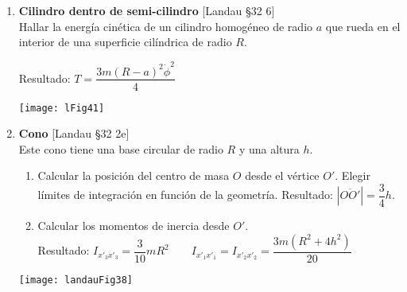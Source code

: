\documentclass[11pt, spanish, a4paper, twoside]{article}
\begin{document}
\begin{enumerate}
	\item 
		\begin{minipage}[t][2.5cm]{0.62\textwidth}
			\textbf{Cilindro dentro de semi-cilindro} [Landau \S 32 6]\\
			Hallar la energía cinética de un cilindro homogéneo de radio \(a\) que rueda en el interior de una superficie cilíndrica de radio \(R\).

			Resultado:
			\(
				T = \dfrac{3 m \left(R - a\right)^{2} \dot{\phi}^{2}}{4}
			\)
		\end{minipage}
		\begin{minipage}[c][1cm][t]{0.3\textwidth}
			\texttt{[image: lFig41]}
		\end{minipage}


	\item 
		\begin{minipage}[t][3.5cm]{0.72\textwidth}
			\textbf{Cono} [Landau \S 32 2e]\\
			Este cono tiene una base circular de radio \(R\) y una altura \(h\).
			 \begin{enumerate}
				\item Calcular la posición del centro de masa \(O\) desde el vértice \(O'\).
				Elegir límites de integración en función de la geometría.
				Resultado: \(|\overline{O O'}| = \dfrac{3}{4} h\).
				\item Calcular los momentos de inercia desde \(O'\).\\
				Resultado: \(I_{x'_3 x'_3} = \dfrac{3}{10} m R^{2} \qquad I_{x'_1 x'_1} = I_{x'_2 x'_2} = \dfrac{3 m \left(R^{2} + 4 h^{2}\right)}{20}\)
			\end{enumerate}
			\end{minipage}
			\begin{minipage}[c][1cm][t]{0.2\textwidth}
			\texttt{[image: landauFig38]}
		\end{minipage}

	\newpage


\end{enumerate}
\end{document}
